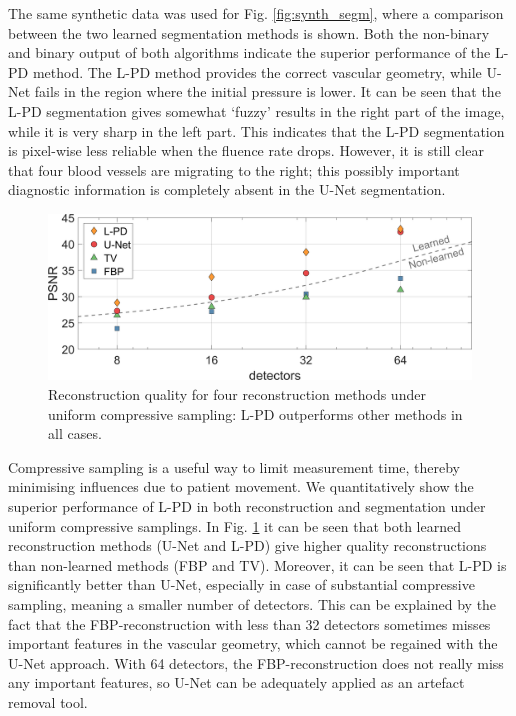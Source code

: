 \documentclass[journal]{IEEEtran}
\begin{document}
The same synthetic data was used for Fig. \ref{fig:synth_segm}, where a comparison between the two learned segmentation methods is shown. Both the non-binary and binary output of both algorithms indicate the superior performance of the L-PD method. The L-PD method provides the correct vascular geometry, while U-Net fails in the region where the initial pressure is lower. It can be seen that the L-PD segmentation gives somewhat `fuzzy' results in the right part of the image, while it is very sharp in the left part. This indicates that the L-PD segmentation is pixel-wise less reliable when the fluence rate drops. However, it is still clear that four blood vessels are migrating to the right; this possibly important diagnostic information is completely absent in the U-Net segmentation.

\begin{figure}[ht!]
\centering
\includegraphics[width=\linewidth]{images/Paper_resultsuniform_PSNR.png}
\caption{Reconstruction quality for four reconstruction methods under uniform compressive sampling: L-PD outperforms other methods in all cases.}
\label{fig:PSNR_recon}
\end{figure}

Compressive sampling is a useful way to limit measurement time, thereby minimising influences due to patient movement. We quantitatively show the superior performance of L-PD in both reconstruction and segmentation under uniform compressive samplings. In Fig. \ref{fig:PSNR_recon} it can be seen that both learned reconstruction methods (U-Net and L-PD) give higher quality reconstructions than non-learned methods (FBP and TV). Moreover, it can be seen that L-PD is significantly better than U-Net, especially in case of substantial compressive sampling, meaning a smaller number of detectors. This can be explained by the fact that the FBP-reconstruction with less than 32 detectors sometimes misses important features in the vascular geometry, which cannot be regained with the U-Net approach. With 64 detectors, the FBP-reconstruction does not really miss any important features, so U-Net can be adequately applied as an artefact removal tool.  
\end{document}
